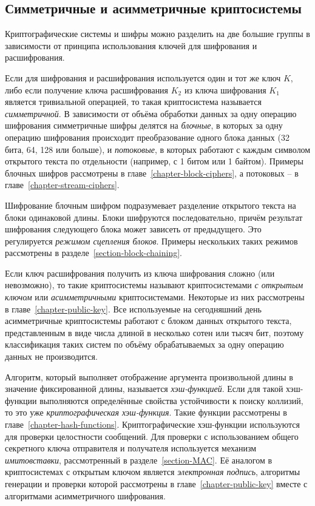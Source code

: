 \subsection{Симметричные и асимметричные криптосистемы}

Криптографические системы и шифры можно разделить на две большие группы в зависимости от принципа использования ключей для шифрования и расшифрования.

Если для шифрования и расшифрования используется один и тот же ключ $K$, либо если получение ключа расшифрования $K_2$ из ключа шифрования $K_1$ является тривиальной операцией, то такая криптосистема называется \emph{симметричной}. В зависимости от объёма обработки данных за одну операцию шифрования симметричные шифры делятся на \emph{блочные}, в которых за одну операцию шифрования происходит преобразование одного блока данных (32 бита, 64, 128 или больше), и \emph{потоковые}, в которых работают с каждым символом открытого текста по отдельности (например, с 1 битом или 1 байтом). Примеры блочных шифров рассмотрены в главе~\ref{chapter-block-ciphers}, а потоковых -- в главе~\ref{chapter-stream-ciphers}.

Шифрование блочным шифром подразумевает разделение открытого текста на блоки одинаковой длины. Блоки шифруются последовательно, причём результат шифрования следующего блока может зависеть от предыдущего. Это регулируется \emph{режимом сцепления блоков}. Примеры нескольких таких режимов рассмотрены в разделе~\ref{section-block-chaining}.

Если ключ расшифрования получить из ключа шифрования сложно (или невозможно), то такие криптосистемы называют криптосистемами \emph{с открытым ключом} или \emph{асимметричными} криптосистемами. Некоторые из них рассмотрены в главе~\ref{chapter-public-key}. Все используемые на сегодняшний день асимметричные криптосистемы работают с блоком данных открытого текста, представленным в виде числа длиной в несколько сотен или тысяч бит, поэтому классификация таких систем по объёму обрабатываемых за одну операцию данных не производится.

Алгоритм, который выполняет отображение аргумента произвольной длины в значение фиксированной длины, называется \emph{хэш-функцией}. Если для такой хэш-функции выполняются определённые свойства устойчивости к поиску коллизий, то это уже \emph{криптографическая хэш-функция}. Такие функции рассмотрены в главе~\ref{chapter-hash-functions}. Криптографические хэш-функции используются для проверки целостности сообщений. Для проверки с использованием общего секретного ключа отправителя и получателя используется механизм \emph{имитовставки}, рассмотренный в разделе~\ref{section-MAC}. Её аналогом в криптосистемах с открытым ключом является \emph{электронная подпись}, алгоритмы генерации и проверки которой рассмотрены в главе~\ref{chapter-public-key} вместе с алгоритмами асимметричного шифрования.
